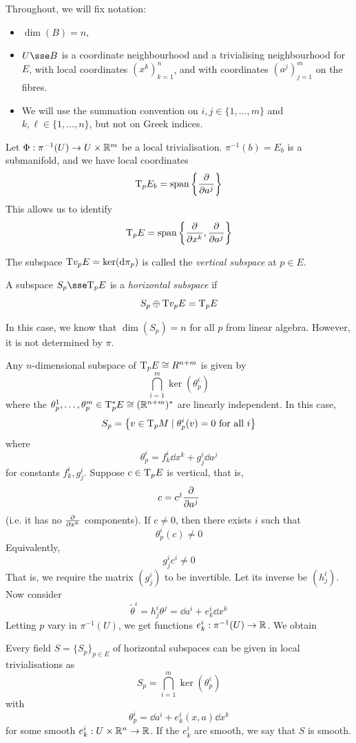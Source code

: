\documentclass{article}
\begin{document}
Throughout, we will fix notation:
\begin{itemize}
    \item \(\dim(B) = n\),
    \item \(U \sse B\) is a coordinate neighbourhood and a trivialising neighbourhood for \(E\), with local coordinates \((x^k)_{k=1}^n\), and with coordinates \((a^j)_{j=1}^m\) on the fibres.
    \item We will use the summation convention on \(i, j \in \{1, \dots, m\}\) and \(k, \ell \in \{1, \dots, n\}\), but not on Greek indices.
\end{itemize}

Let \(\Phi : \pi^{-1}(U) \to U \times \mathbb{R}^m\) be a local trivialisation. \(\pi^{-1}(b) = E_b\) is a submanifold, and we have local coordinates
\[\mathrm{T}_pE_b = \operatorname{span}\left\{\pdv{a^j}\right\}\]
This allows us to identify
\[\mathrm{T}_pE = \operatorname{span}\left\{\pdv{x^k}, \pdv{a^j}\right\}\]

\begin{definition}
    The subspace \(\mathrm{T} v_pE = \ker(\dd\pi_p)\) is called the \emph{vertical subspace} at \(p \in E\).

    A subspace \(S_p \sse \T_pE\) is a \emph{horizontal subspace} if
    \[S_p \oplus \mathrm{T} v_pE = \mathrm{T}_p E\]
\end{definition}
In this case, we know that \(\dim(S_p) = n\) for all \(p\) from linear algebra. However, it is not determined by \(\pi\).

Any \(n\)-dimensional subspace of \(\mathrm{T}_pE \cong R^{n+m}\) is given by
\[\bigcap_{i=1}^m \ker(\theta_p^i)\]
where the \(\theta_p^1, \dots, \theta_p^m \in \mathrm{T}_p^*E \cong (\mathbb{R}^{n+m})^*\) are linearly independent. In this case,
\[S_p = \left\{v \in \mathrm{T}_pM \mid \theta^i_p(v) = 0 \text{ for all }i\right\}\]
where
\[\theta^i_p = f^i_k\dd x^k + g^i_j \dd a^j\]
for constants \(f^i_k, g^i_j\). Suppose \(c \in \mathrm{T}_pE\) is vertical, that is,
\[c = c^j \pdv{a^j}\]
(i.e. it has no \(\pdv{x^k}\) components). If \(c \ne 0\), then there exists \(i\) such that
\[\theta^i_p(c) \ne 0\]
Equivalently,
\[g^i_j c^i \ne 0\]
That is, we require the matrix \((g^i_j)\) to be invertible. Let its inverse be \((h^i_j)\). Now consider
\[\tilde\theta^i = h^i_j\theta^j = \dd a^i + e^i_k\dd x^k\]
Letting \(p\) vary in \(\pi^{-1}(U)\), we get functions \(e^i_k : \pi^{-1}(U) \to \mathbb{R}\). We obtain
\begin{proposition}
    Every field \(S = \{S_p\}_{p \in E}\) of horizontal subspaces can be given in local trivialisations as
    \[S_p = \bigcap_{i=1}^m \ker(\theta^i_p)\]
    with
    \[\theta^i_p = \dd a^i + e^i_k(x, a)\dd x^k\]
    for some smooth \(e^i_k : U \times \mathbb{R}^n \to \mathbb{R}\). If the \(e^i_k\) are smooth, we say that \(S\) is smooth.
\end{proposition}
\end{document}
